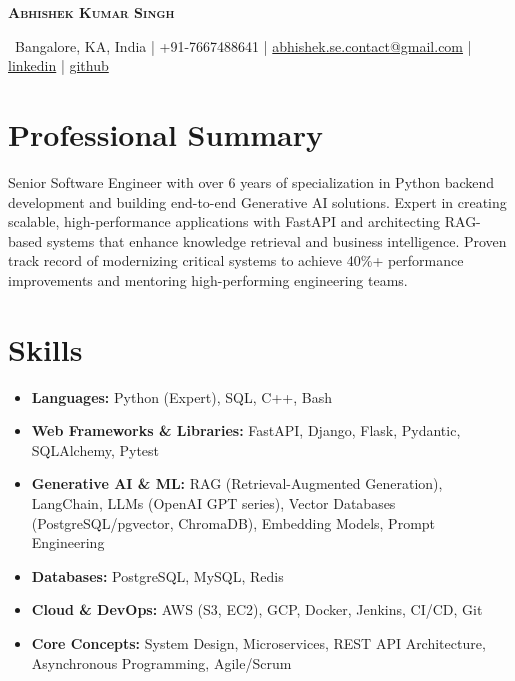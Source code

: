 \documentclass[10pt, a4paper]{article}
\newcommand{\skillCat}[2]{\textbf{#1:} #2}
\begin{document}
\pagestyle{empty} %

\begin{center}
    {\Huge\bfseries\scshape Abhishek Kumar Singh}
    \vspace{1.5ex}
    
    \small
    \faMapMarkerAlt\ Bangalore, KA, India \quad | \quad
     +91-7667488641 \quad | \quad
     \href{mailto:abhishek.se.contact@gmail.com}{abhishek.se.contact@gmail.com} \quad | \quad
     \href{https://linkedin.com/in/abhishek-kumar-singh-07}{linkedin} \quad | \quad
    \href{https://github.com/AbhishekKumarSingh07}{github}
\end{center}

\section{Professional Summary}
\small
Senior Software Engineer with over 6 years of specialization in Python backend development and building end-to-end Generative AI solutions. Expert in creating scalable, high-performance applications with FastAPI and architecting RAG-based systems that enhance knowledge retrieval and business intelligence. Proven track record of modernizing critical systems to achieve 40\%+ performance improvements and mentoring high-performing engineering teams.

\section{Skills}
\begin{itemize}[leftmargin=*, nosep, itemsep=0.5ex]
    \item \small \skillCat{Languages}{Python (Expert), SQL, C++, Bash}
    \item \small \skillCat{Web Frameworks \& Libraries}{FastAPI, Django, Flask, Pydantic, SQLAlchemy, Pytest}
    \item \small \skillCat{Generative AI \& ML}{RAG (Retrieval-Augmented Generation), LangChain, LLMs (OpenAI GPT series), Vector Databases (PostgreSQL/pgvector, ChromaDB), Embedding Models, Prompt Engineering}
    \item \small \skillCat{Databases}{PostgreSQL, MySQL, Redis}
    \item \small \skillCat{Cloud \& DevOps}{AWS (S3, EC2), GCP, Docker, Jenkins, CI/CD, Git}
    \item \small \skillCat{Core Concepts}{System Design, Microservices, REST API Architecture, Asynchronous Programming, Agile/Scrum}
\end{itemize}
\end{document}
